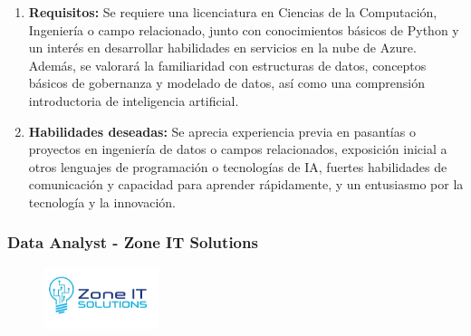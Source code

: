 \documentclass[12pt]{article}
\begin{document}
\begin{enumerate}
                    \item \textbf{Requisitos:}
                        Se requiere una licenciatura en Ciencias de la Computación, Ingeniería o campo relacionado, junto con conocimientos básicos de Python y un interés en desarrollar habilidades en servicios en la nube de Azure. Además, se valorará la familiaridad con estructuras de datos, conceptos básicos de gobernanza y modelado de datos, así como una comprensión introductoria de inteligencia artificial.

                    \item \textbf{Habilidades deseadas:}
                        Se aprecia experiencia previa en pasantías o proyectos en ingeniería de datos o campos relacionados, exposición inicial a otros lenguajes de programación o tecnologías de IA, fuertes habilidades de comunicación y capacidad para aprender rápidamente, y un entusiasmo por la tecnología y la innovación.

                \end{enumerate}

            \newpage


            \subsubsection{Data Analyst - Zone IT Solutions}
                
                \begin{figure}[!h]
                    \centering
                    \includegraphics[width=0.3\textwidth]{Recursos/Img/ZoneITLogo.png}
                \end{figure}
                
\end{document}
